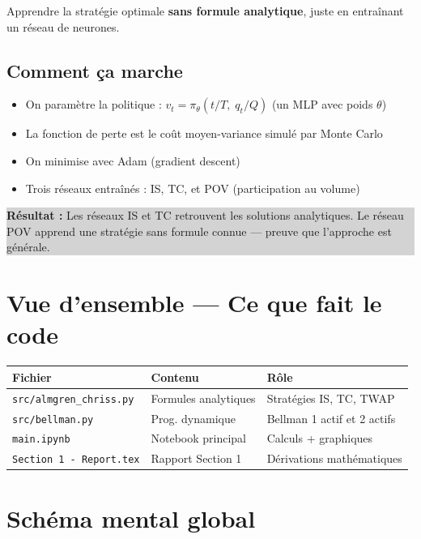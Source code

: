 \documentclass[12pt,a4paper]{article}
\begin{document}
Apprendre la stratégie optimale \textbf{sans formule analytique}, juste en entraînant un réseau de neurones.

\subsection{Comment ça marche}

\begin{itemize}[noitemsep]
    \item On paramètre la politique : $v_t = \pi_\theta(t/T,\; q_t/Q)$ (un MLP avec poids $\theta$)
    \item La fonction de perte est le coût moyen-variance simulé par Monte Carlo
    \item On minimise avec Adam (gradient descent)
    \item Trois réseaux entraînés : IS, TC, et POV (participation au volume)
\end{itemize}

\medskip
\colorbox{lightgray}{\parbox{\linewidth}{\small
\textbf{Résultat :} Les réseaux IS et TC retrouvent les solutions analytiques. Le réseau POV apprend une stratégie sans formule connue — preuve que l'approche est générale.
}}

\section{Vue d'ensemble — Ce que fait le code}

\begin{center}
\begin{tabular}{lll}
\toprule
\textbf{Fichier} & \textbf{Contenu} & \textbf{Rôle} \\
\midrule
\texttt{src/almgren\_chriss.py} & Formules analytiques & Stratégies IS, TC, TWAP \\
\texttt{src/bellman.py} & Prog. dynamique & Bellman 1 actif et 2 actifs \\
\texttt{main.ipynb} & Notebook principal & Calculs + graphiques \\
\texttt{Section 1 - Report.tex} & Rapport Section 1 & Dérivations mathématiques \\
\bottomrule
\end{tabular}
\end{center}

\section{Schéma mental global}
\end{document}
